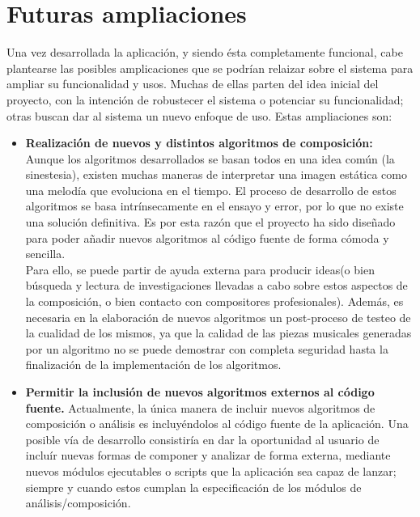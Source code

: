 \section{Futuras ampliaciones}
\label{sec:ampliaciones}

Una vez desarrollada la aplicación, y siendo ésta completamente funcional, cabe plantearse las posibles amplicaciones que se podrían relaizar sobre el sistema para ampliar su funcionalidad y usos. Muchas de ellas parten del idea inicial del proyecto, con la intención de robustecer el sistema o potenciar su funcionalidad; otras buscan dar al sistema un nuevo enfoque de uso. Estas ampliaciones son:

\begin{itemize}

\item\textbf{Realización de nuevos y distintos algoritmos de composición:} Aunque los algoritmos desarrollados se basan todos en una idea común (la sinestesia), existen muchas maneras de interpretar una imagen estática como una melodía que evoluciona en el tiempo. El proceso de desarrollo de estos algoritmos se basa intrínsecamente en el ensayo y error, por lo que no existe una solución definitiva. Es por esta razón que el proyecto ha sido diseñado para poder añadir nuevos algoritmos al código fuente de forma cómoda y sencilla.\\

Para ello, se puede partir de ayuda externa para producir ideas(o bien búsqueda y lectura de investigaciones llevadas a cabo sobre estos aspectos de la composición, o bien contacto con compositores profesionales). Además, es necesaria en la elaboración de nuevos algoritmos un post-proceso de testeo de la cualidad de los mismos, ya que la calidad de las piezas musicales generadas por un algoritmo no se puede demostrar con completa seguridad hasta la finalización de la implementación de los algoritmos.

\item\textbf{Permitir la inclusión de nuevos algoritmos externos al código fuente.} Actualmente, la única manera de incluir nuevos algoritmos de composición o análisis es incluyéndolos al código fuente de la aplicación. Una posible vía de desarrollo consistiría en dar la oportunidad al usuario de incluír nuevas formas de componer y analizar de forma externa, mediante nuevos módulos ejecutables o scripts que la aplicación sea capaz de lanzar; siempre y cuando estos cumplan la especificación de los módulos de análisis/composición.\\


\end{itemize}
